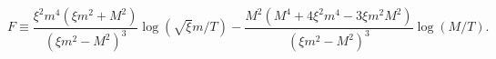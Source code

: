 \begin{equation}
F\equiv \frac{\xi^2 m^4(\xi m^2 + M^2)}{(\xi m^2 -
M^2)^3}\log(\sqrt{\xi}m/T) - \frac{M^2(M^4 + 4 \xi^2 m^4 - 3 \xi m^2
M^2)}{(\xi m^2 - M^2)^3} \log(M/T).
\end{equation}

